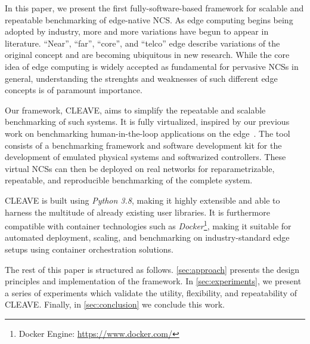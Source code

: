 In this paper, we present the first fully-software-based framework for scalable and repeatable benchmarking of edge-native \ac{NCS}.
As edge computing begins being adopted by industry, more and more variations have begun to appear in literature.
``Near'', ``far'', ``core'', and ``telco'' edge describe variations of the original concept and are becoming ubiquitous in new research.
While the core idea of edge computing is widely accepted as fundamental for pervasive \acp{NCS} in general, understanding the strenghts and weaknesses of such different edge concepts is of paramount importance.

Our framework, \ac{CLEAVE}, aims to simplify the repeatable and scalable benchmarking of such systems.
It is fully virtualized, inspired by our previous work on benchmarking human-in-the-loop applications on the edge~\cite{Olguin2019EdgeDroid}.
The tool consists of a benchmarking framework and software development kit for the development of emulated physical systems and softwarized controllers.
These virtual \acp{NCS} can then be deployed on real networks for reparametrizable, repeatable, and reproducible benchmarking of the complete system.

\ac{CLEAVE} is built using \emph{Python 3.8}, making it highly extensible and able to harness the multitude of already existing user libraries.
It is furthermore compatible with container technologies such as \emph{Docker}\footnote{Docker Engine: \url{https://www.docker.com/}}, making it suitable for automated deployment, scaling, and benchmarking on industry-standard edge setups using container orchestration solutions.

The rest of this paper is structured as follows.
\cref{sec:approach} presents the design principles and implementation of the framework.
In \cref{sec:experiments}, we present a series of experiments which validate the utility, flexibility, and repeatability of \ac{CLEAVE}.
Finally, in \cref{sec:conclusion} we conclude this work.